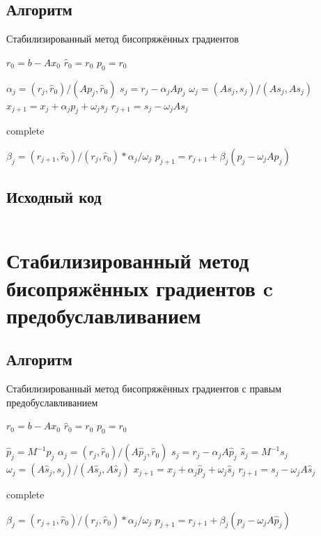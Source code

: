 \documentclass[12pt, a4paper]{article}
\begin{document}
\subsection{Алгоритм}

\begin{algorithm}[H]
\caption{Стабилизированный метод бисопряжённых градиентов}\label{alg:bcgstab}
\begin{algorithmic}
\State $r_0 = b - Ax_0$
\State $\hat{r}_0 = r_0$
\State $p_0 = r_0$

\State $\alpha_j = (r_j, \hat{r}_0)/(Ap_j, \hat{r}_0)$
\State $s_j = r_j - \alpha_j Ap_j$
\State $\omega_j = (As_j, s_j)/(As_j, As_j)$
\State $x_{j+1} = x_j + \alpha_j p_j + \omega_j s_j$
\State $r_{j+1} = s_j - \omega_j As_j$

\State complete
\EndIf

\State $\beta_j = (r_{j+1}, \hat{r}_0) / (r_j, \hat{r}_0) * \alpha_j / \omega_j$
\State $p_{j+1} = r_{j+1} + \beta_j(p_j - \omega_j Ap_j)$
\EndFor
\end{algorithmic}
\end{algorithm}

\subsection{Исходный код}

\inputminted[firstline=5, lastline=78]{c}{/home/mehandes/c/src/github.com/meha4j/math/vec/iss/src/iss_csj.c}

\section{Стабилизированный метод бисопряжённых градиентов c предобуславливанием}
\subsection{Алгоритм}

\begin{algorithm}[H]
\caption{Стабилизированный метод бисопряжённых градиентов с правым предобуславливанием}\label{alg:bcgstabcon}
\begin{algorithmic}
\State $r_0 = b - Ax_0$
\State $\hat{r}_0 = r_0$
\State $p_0 = r_0$

\State $\hat{p}_j = M^{-1}p_j$
\State $\alpha_j = (r_j, \hat{r}_0)/(A\hat{p}_j, \hat{r}_0)$
\State $s_j = r_j - \alpha_j A\hat{p}_j$
\State $\hat{s}_j = M^{-1}s_j$
\State $\omega_j = (A\hat{s}_j, s_j)/(A\hat{s}_j, A\hat{s}_j)$
\State $x_{j+1} = x_j + \alpha_j \hat{p}_j + \omega_j \hat{s}_j$
\State $r_{j+1} = s_j - \omega_j A\hat{s}_j$

\State complete
\EndIf

\State $\beta_j = (r_{j+1}, \hat{r}_0) / (r_j, \hat{r}_0) * \alpha_j / \omega_j$
\State $p_{j+1} = r_{j+1} + \beta_j(p_j - \omega_j A\hat{p}_j)$
\EndFor
\end{algorithmic}
\end{algorithm}
\end{document}
